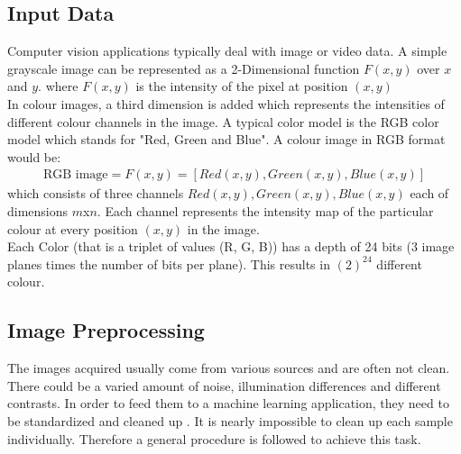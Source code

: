 \subsection{Input Data}
Computer vision applications typically deal with image or video data. A simple grayscale image can be represented as a 2-Dimensional function $F(x,y)$ over $x$ and $y$. where $F(x,y)$ is the intensity of the pixel at position $(x,y)$\\
In colour images, a third dimension is added which represents the intensities of different colour channels in the image. A typical color model is the RGB color model which stands for "Red, Green and Blue". A colour image in RGB format would be:
\begin{align*}
    \text{RGB image} = F(x,y) = [Red(x,y), Green(x,y), Blue(x,y)]
\end{align*}
which consists of three channels $Red(x,y), Green(x,y), Blue(x,y)$ each of dimensions $m$x$n$. Each channel represents the intensity map of the particular colour at every position $(x,y)$ in the image.\\
Each Color (that is a triplet of values (R, G, B)) has a depth of 24 bits (3 image planes times the number of bits per plane).
This results in $(2)^{24}$ different colour\cite{gonzalez2002digital}.


\subsection{Image Preprocessing}
The images acquired usually come from various sources and are often not clean. There could be a varied amount of noise, illumination differences and different contrasts. In order to feed them to a machine learning application, they need to be standardized and cleaned up \cite{WEB:manning}. It is nearly impossible to clean up each sample individually. Therefore a general procedure is followed to achieve this task.

%	
%	

